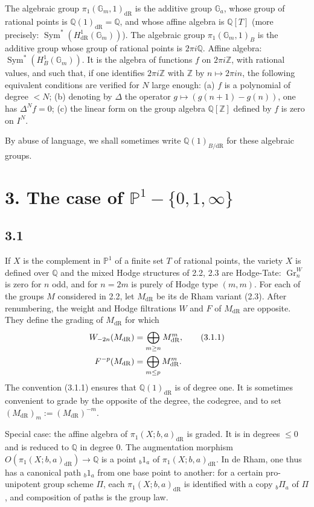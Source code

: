 \documentclass[11pt]{article}
\newcommand{\Q}{\mathbb Q}
\newcommand{\Z}{\mathbb Z}
\newcommand{\Gm}{\mathbb G_m}
\newcommand{\Ga}{\mathbb G_a}
\newcommand{\PP}{\mathbb P}
\newcommand{\Sym}{\operatorname{Sym}}
\newcommand{\Gr}{\operatorname{Gr}}
\newcommand{\dR}{\mathrm{dR}}
\begin{document}
The algebraic group $\pi_1(\Gm,1)_{\dR}$ is the additive group $\Ga$, whose group of rational points is $\Q(1)_{\dR}=\Q$, and whose affine algebra is $\Q[T]$ (more precisely: $\Sym^*(H^1_{\dR}(\Gm))$).
The algebraic group $\pi_1(\Gm,1)_B$ is the additive group whose group of rational points is $2\pi i\Q$.
Affine algebra: $\Sym^*(H^1_B(\Gm))$.
It is the algebra of functions $f$ on $2\pi i\Z$, with rational values, and such that, if one identifies $2\pi i\Z$ with $\Z$ by $n\mapsto2\pi in$, the following equivalent conditions are verified for $N$ large enough: (a) $f$ is a polynomial of degree $<N$; (b) denoting by $\Delta$ the operator $g\mapsto(g(n+1)-g(n))$, one has $\Delta^Nf=0$; (c) the linear form on the group algebra $\Q[\Z]$ defined by $f$ is zero on $I^N$.

By abuse of language, we shall sometimes write $\Q(1)_{B/\dR}$ for these algebraic groups.

\section*{3. The case of $\PP^1-\{0,1,\infty\}$}

\subsection*{3.1}
If $X$ is the complement in $\PP^1$ of a finite set $T$ of rational points, the variety $X$ is defined over $\Q$ and the mixed Hodge structures of 2.2, 2.3 are Hodge-Tate: $\Gr^W_n$ is zero for $n$ odd, and for $n=2m$ is purely of Hodge type $(m,m)$.
For each of the groups $M$ considered in 2.2, let $M_{\dR}$ be its de Rham variant (2.3).
After renumbering, the weight and Hodge filtrations $W$ and $F$ of $M_{\dR}$ are opposite.
They define the grading of $M_{\dR}$ for which
\begin{align}
 W_{-2n}(M_{\dR})&=\bigoplus_{m\geq n}M^m_{\dR},
\tag{3.1.1}\\
 F^{-p}(M_{\dR})&=\bigoplus_{m\leq p}M^m_{\dR}.
\notag
\end{align}
The convention (3.1.1) ensures that $\Q(1)_{\dR}$ is of degree one.
It is sometimes convenient to grade by the opposite of the degree, the codegree, and to set $(M_{\dR})_m:=(M_{\dR})^{-m}$.

Special case: the affine algebra of $\pi_1(X;b,a)_{\dR}$ is graded.
It is in degrees $\leq0$ and is reduced to $\Q$ in degree $0$.
The augmentation morphism $O(\pi_1(X;b,a)_{\dR})\to\Q$ is a point ${}_b1_a$ of $\pi_1(X;b,a)_{\dR}$.
In de Rham, one thus has a canonical path ${}_b1_a$ from one base point to another: for a certain pro-unipotent group scheme $\Pi$, each $\pi_1(X;b,a)_{\dR}$ is identified with a copy ${}_b\Pi_a$ of $\Pi$, and composition of paths is the group law.
\end{document}

